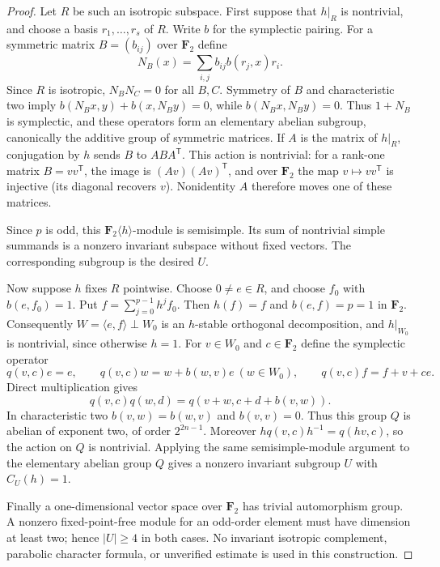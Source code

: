 \begin{proof}
Let $R$ be such an isotropic subspace. First suppose that $h|_R$ is
nontrivial, and choose a basis $r_1,\ldots,r_s$ of $R$. Write $b$ for the
symplectic pairing. For a symmetric matrix $B=(b_{ij})$ over $\mathbf F_2$
define
\[
             N_B(x)=\sum_{i,j}b_{ij}b(r_j,x)r_i.
\]
Since $R$ is isotropic, $N_BN_C=0$ for all $B,C$. Symmetry of $B$ and
characteristic two imply
$b(N_Bx,y)+b(x,N_By)=0$, while $b(N_Bx,N_By)=0$.
Thus $1+N_B$ is symplectic, and these operators form an elementary
abelian subgroup, canonically the additive group of symmetric matrices.
If $A$ is the matrix of $h|_R$, conjugation by $h$ sends $B$ to
$ABA^{\mathsf T}$. This action is nontrivial: for a rank-one matrix
$B=vv^{\mathsf T}$, the image is $(Av)(Av)^{\mathsf T}$, and over
$\mathbf F_2$ the map $v\mapsto vv^{\mathsf T}$ is injective (its diagonal
recovers $v$). Nonidentity $A$ therefore moves one of these matrices.

Since $p$ is odd, this $\mathbf F_2\langle h\rangle$-module is semisimple.
Its sum of nontrivial simple summands is a nonzero invariant subspace
without fixed vectors. The corresponding subgroup is the desired $U$.

Now suppose $h$ fixes $R$ pointwise. Choose $0\ne e\in R$, and choose
$f_0$ with $b(e,f_0)=1$. Put
$f=\sum_{j=0}^{p-1}h^jf_0$. Then $h(f)=f$ and $b(e,f)=p=1$ in
$\mathbf F_2$. Consequently
$W=\langle e,f\rangle\perp W_0$ is an $h$-stable orthogonal decomposition,
and $h|_{W_0}$ is nontrivial, since otherwise $h=1$.
For $v\in W_0$ and $c\in\mathbf F_2$ define the symplectic operator
\[
 q(v,c)e=e,\qquad
 q(v,c)w=w+b(w,v)e\ (w\in W_0),\qquad
 q(v,c)f=f+v+ce.
\]
Direct multiplication gives
\[
       q(v,c)q(w,d)=q(v+w,c+d+b(v,w)).
\tag{HES.4}
\]
In characteristic two $b(v,w)=b(w,v)$ and $b(v,v)=0$.
Thus this group $Q$ is abelian of exponent two, of order $2^{2n-1}$.
Moreover $h q(v,c)h^{-1}=q(hv,c)$, so the action on $Q$ is nontrivial.
Applying the same semisimple-module argument to the elementary abelian
group $Q$ gives a nonzero invariant subgroup $U$ with $C_U(h)=1$.

Finally a one-dimensional vector space over $\mathbf F_2$ has trivial
automorphism group. A nonzero fixed-point-free module for an odd-order
element must have dimension at least two; hence $|U|\ge4$ in both cases.
No invariant isotropic complement, parabolic character formula, or
unverified estimate is used in this construction.
\end{proof}

